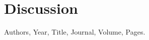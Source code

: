 \documentclass{article}
\begin{document}
\section{Discussion}\label{sec:discussion}







\begin{thebibliography}{}

Authors, Year, Title, Journal, Volume, Pages.

\end{thebibliography}
\end{document}
